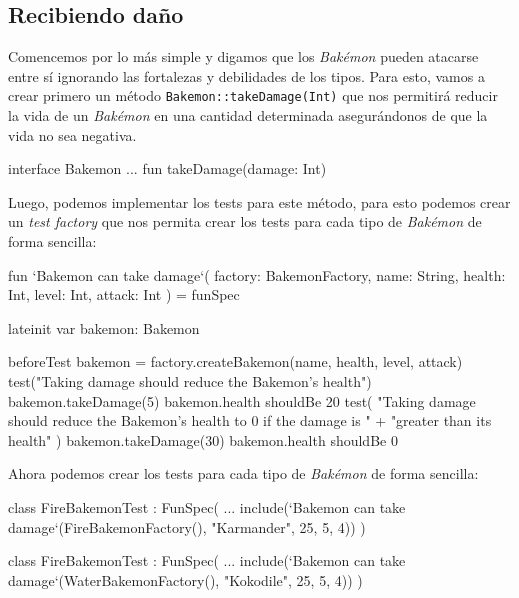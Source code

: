 \subsection{Recibiendo daño}
  Comencemos por lo más simple y digamos que los \textit{Bakémon} pueden atacarse entre sí ignorando
  las fortalezas y debilidades de los tipos.
  Para esto, vamos a crear primero un método \texttt{Bakemon::takeDamage(Int)} que nos permitirá
  reducir la vida de un \textit{Bakémon} en una cantidad determinada asegurándonos de que la vida no
  sea negativa.

  \begin{kotlin}
    interface Bakemon {
      ...
      fun takeDamage(damage: Int)
    }
  \end{kotlin}

  Luego, podemos implementar los tests para este método, para esto podemos crear un \textit{test 
  factory} que nos permita crear los tests para cada tipo de \textit{Bakémon} de forma sencilla:

  \begin{kotlin}
    fun `Bakemon can take damage`(
      factory: BakemonFactory,
      name: String,
      health: Int,
      level: Int,
      attack: Int
    ) = funSpec {
      lateinit var bakemon: Bakemon

      beforeTest {
        bakemon = factory.createBakemon(name, health, level, attack)
      }
      test("Taking damage should reduce the Bakemon's health") {
        bakemon.takeDamage(5)
        bakemon.health shouldBe 20
      }
      test(
        "Taking damage should reduce the Bakemon's health to 0 if the damage is " +
            "greater than its health"
      ) {
        bakemon.takeDamage(30)
        bakemon.health shouldBe 0
      }
    }
  \end{kotlin}

  Ahora podemos crear los tests para cada tipo de \textit{Bakémon} de forma sencilla:

  \begin{kotlin}
    class FireBakemonTest : FunSpec({
      ...
      include(`Bakemon can take damage`(FireBakemonFactory(), "Karmander", 25, 5, 4))
    })
  \end{kotlin}

  \begin{kotlin}
    class FireBakemonTest : FunSpec({
      ...
      include(`Bakemon can take damage`(WaterBakemonFactory(), "Kokodile", 25, 5, 4))
    })
  \end{kotlin}


